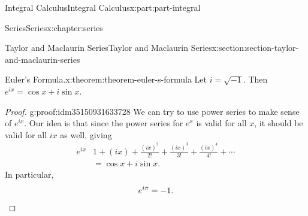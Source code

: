 \documentclass[twoside,10pt,]{book}
\numberwithin{equation}{part}
\newcommand{\qedhere}{\relax}
\newcommand{\amp}{&}
\begin{document}
\begin{partptx}{Integral Calculus}{}{Integral Calculus}{}{}{x:part:part-integral}
\begin{chapterptx}{Series}{}{Series}{}{}{x:chapter:series}
\begin{sectionptx}{Taylor and Maclaurin Series}{}{Taylor and Maclaurin Series}{}{}{x:section:section-taylor-and-maclaurin-series}
\begin{theorem}{Euler's Formula.}{}{x:theorem:theorem-euler-s-formula}%
Let \(i = \sqrt{-1}\). Then \(e^{ix} = \cos x + i\sin x\).%
\end{theorem}
\begin{proof}{}{g:proof:idm35150931633728}
We can try to use power series to make sense of \(e^{ix}\). Our idea is that since the power series for \(e^{x}\) is valid for all \(x\), it should be valid for all \(ix\) as well, giving%
\begin{align*}
e^{ix} \amp 1 + (ix) + \frac{(ix)^{2}}{2!} + \frac{(ix)^{3}}{3!} + \frac{(ix)^{4}}{4!} + \cdots \\
\amp = \cos x + i\sin x \text{.}
\end{align*}
In particular,%
\begin{equation*}
e^{i\pi} = -1\text{.}\qedhere
\end{equation*}
%
\end{proof}
\end{sectionptx}
\end{chapterptx}
 \end{partptx}
%
%
\typeout{************************************************}
\typeout{************************************************}
%
\end{document}
